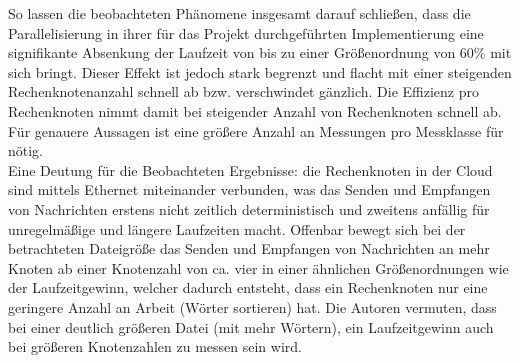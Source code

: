So lassen die beobachteten Phänomene insgesamt darauf schließen, dass die Parallelisierung in ihrer für das Projekt durchgeführten Implementierung eine signifikante Absenkung der Laufzeit von bis zu einer Größenordnung von 60\% mit sich bringt. Dieser Effekt ist jedoch stark begrenzt und flacht mit einer steigenden Rechenknotenanzahl schnell ab bzw. verschwindet gänzlich. Die Effizienz pro Rechenknoten nimmt damit bei steigender Anzahl von Rechenknoten schnell ab.
Für genauere Aussagen ist eine größere Anzahl an Messungen pro Messklasse für nötig.
\\
Eine Deutung für die Beobachteten Ergebnisse: die Rechenknoten in der Cloud sind mittels Ethernet miteinander verbunden, was das Senden und Empfangen von Nachrichten erstens nicht zeitlich deterministisch und zweitens anfällig für unregelmäßige und längere Laufzeiten macht. Offenbar bewegt sich bei der betrachteten Dateigröße das Senden und Empfangen von Nachrichten an mehr Knoten ab einer Knotenzahl von ca. vier in einer ähnlichen Größenordnungen wie der Laufzeitgewinn, welcher dadurch entsteht, dass ein Rechenknoten nur eine geringere Anzahl an Arbeit (Wörter sortieren) hat. Die Autoren vermuten, dass bei einer deutlich größeren Datei (mit mehr Wörtern), ein Laufzeitgewinn auch bei größeren Knotenzahlen zu messen sein wird.